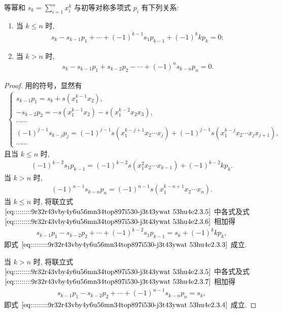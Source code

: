 \documentclass[../../main.tex]{subfiles}%
\begin{document}
\begin{theorem}[Newton 公式]\label{theorem:抽象代数--Newton公式}
等幂和 \( s_k = \sum_{i=1}^n x_i^k \) 与初等对称多项式 \( p_i \) 有下列关系:
\begin{enumerate}[(1)]
\item 当 \( k \leqslant n \) 时,
\begin{align}
s_k - s_{k-1} p_1 + \cdots + (-1)^{k-1} s_1 p_{k-1} + (-1)^k k p_k = 0; \label{eq:::::::::9r32r43vby4y6u56mn34top897i530-j3t43ywat 53hu4e2.3.3}
\end{align}
\item 当 \( k > n \) 时,
\begin{align}
s_k - s_{k-1} p_1 + s_{k-2} p_2 - \cdots + (-1)^n s_{k-n} p_n = 0. \label{eq:::::::::9r32r43vby4y6u56mn34top897i530-j3t43ywat 53hu4e2.3.4}
\end{align}
\end{enumerate}
\end{theorem}
\begin{proof}
用的符号，显然有
\begin{align}
\begin{cases}
s_{k-1} p_1 = s_k + s(x_1^{k-1} x_2), \\
-s_{k-2} p_2 = -s(x_1^{k-1} x_2) - s(x_1^{k-2} x_2 x_3), \\
\cdots\cdots \\
(-1)^{j-1} s_{k-j} p_j = (-1)^{j-1} s(x_1^{k-j+1} x_2 \cdots x_j) + (-1)^{j-1} s(x_1^{k-j} x_2 \cdots x_j x_{j+1}), \\
\cdots\cdots
\end{cases} \label{eq:::::::::9r32r43vby4y6u56mn34top897i530-j3t43ywat 53hu4e2.3.5}
\end{align}
且当 \( k \leqslant n \) 时,
\begin{align}
(-1)^{k-2} s_1 p_{k-1} = (-1)^{k-2} s(x_1^2 x_2 \cdots x_{k-1}) + (-1)^{k-2} k p_k. \label{eq:::::::::9r32r43vby4y6u56mn34top897i530-j3t43ywat 53hu4e2.3.6}
\end{align}
当 \( k > n \) 时,
\begin{align}
(-1)^{n-1} s_{k-n} p_n = (-1)^{n-1} s(x_1^{k-n+1} x_2 \cdots x_n). \label{eq:::::::::9r32r43vby4y6u56mn34top897i530-j3t43ywat 53hu4e2.3.7}
\end{align}
当 \( k \leqslant n \) 时, 将联立式 \(\eqref{eq:::::::::9r32r43vby4y6u56mn34top897i530-j3t43ywat 53hu4e2.3.5}\) 中各式及式 \(\eqref{eq:::::::::9r32r43vby4y6u56mn34top897i530-j3t43ywat 53hu4e2.3.6}\) 相加得
\begin{align*}
s_{k-1} p_1 - s_{k-2} p_2 + \cdots + (-1)^{k-2} s_1 p_{k-1} = s_k + (-1)^k k p_k,
\end{align*}
即式 \(\eqref{eq:::::::::9r32r43vby4y6u56mn34top897i530-j3t43ywat 53hu4e2.3.3}\) 成立.

当 \( k > n \) 时, 将联立式 \(\eqref{eq:::::::::9r32r43vby4y6u56mn34top897i530-j3t43ywat 53hu4e2.3.5}\) 中各式及式 \(\eqref{eq:::::::::9r32r43vby4y6u56mn34top897i530-j3t43ywat 53hu4e2.3.7}\) 相加得
\begin{align*}
s_{k-1} p_1 - s_{k-2} p_2 + \cdots + (-1)^{n-1} s_{k-n} p_n = s_k,
\end{align*}
即式 \(\eqref{eq:::::::::9r32r43vby4y6u56mn34top897i530-j3t43ywat 53hu4e2.3.4}\) 成立.
\end{proof}
\end{document}

